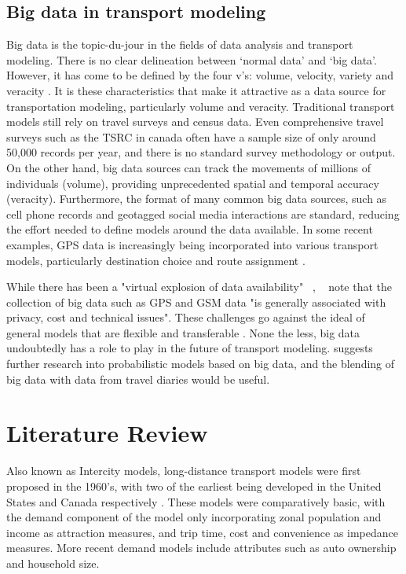 \section{Big data in transport modeling}
Big data is the topic-du-jour in the fields of data analysis and transport modeling. There is no clear delineation between `normal data' and `big data'. However, it has come to be defined by the four v's: volume, velocity, variety and veracity \parencite{beyer2012importance}. It is these characteristics that make it attractive as a data source for transportation modeling, particularly volume and veracity. Traditional transport models still rely on travel surveys and census data. Even comprehensive travel surveys such as the TSRC in canada  often have a sample size of only around 50,000 records per year, and there is no standard survey methodology or output. On the other hand, big data sources can track the movements of millions of individuals (volume), providing unprecedented spatial and temporal accuracy (veracity). Furthermore, the format of many common big data sources, such as cell phone records and geotagged social media interactions are standard, reducing the effort needed to define models around the data available. In some recent examples, GPS data is increasingly being incorporated into various transport models, particularly destination choice \parencite{schonfelder2006analysis, pan2006cellular} and route assignment \parencite{broach2012cyclists, menghini2010route}.

While there has been a "virtual explosion of data availability" ~\textcite{nagel2001workshop},  ~\textcite{horni2012improve} note that  the collection of big data such as GPS and GSM data "is generally associated with privacy, cost and technical issues".  These challenges go against the ideal of general models that are flexible and transferable \parencite{patriksson2015traffic}. None the less, big data undoubtedly has a role to play in the future of transport modeling. \textcite{rth2015} suggests further research into probabilistic models based on big data, and the blending of big data with data from travel diaries would be useful. 

\chapter{Literature Review}
\label{section:lit-review}
Also known as Intercity models, long-distance transport models were first proposed in the 1960’s, with two of the earliest being developed in the United States and Canada respectively \parencite{CTC71}. These models were comparatively basic, with the demand component of the model only incorporating zonal population and income as attraction measures, and trip time, cost and convenience as impedance measures. More recent demand models include attributes such as auto ownership and household size. 

